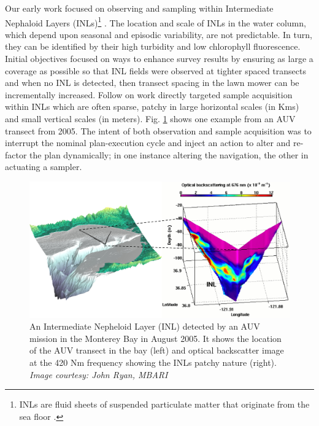 Our early work focused on observing and sampling within Intermediate
Nephaloid Layers (INLs)\footnote{INLs are fluid sheets of suspended
  particulate matter that originate from the sea floor
  \cite{mcphee-shaw2006}.} \cite{ryan10}. The location and scale of
INLs in the water column, which depend upon seasonal and episodic
variability, are not predictable. In turn, they can be identified by
their high turbidity and low chlorophyll fluorescence. Initial
objectives focused on ways to enhance survey results by ensuring as
large a coverage as possible so that INL fields were observed at
tighter spaced transects and when no INL is detected, then transect
spacing in the lawn mower can be incrementally increased. Follow on
work directly targeted sample acquisition within INLs which are often
sparse, patchy in large horizontal scales (in Kms) and small vertical
scales (in meters). Fig. \ref{fig:inl} shows one example from an AUV
transect from 2005. The intent of both observation and sample
acquisition was to interrupt the nominal plan-execution cycle and
inject an action to alter and re-factor the plan dynamically; in one
instance altering the navigation, the other in actuating a sampler.

\begin{figure}[b]
\centering
\includegraphics[scale=0.65]{figs/inl.jpeg}
\caption{\small An Intermediate Nepheloid Layer (INL) detected by an
  AUV mission  in the Monterey
  Bay in August 2005. It shows the location of the AUV transect in the
  bay (left) and optical backscatter image at the 420 Nm frequency
  showing the INLs patchy nature (right). \emph{Image courtesy: John
    Ryan, MBARI}}
\label{fig:inl}
\end{figure}

